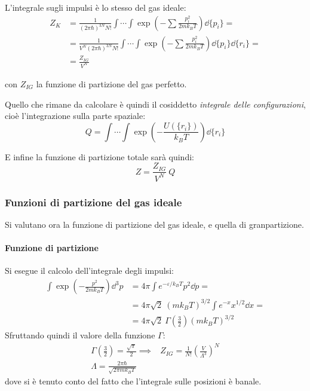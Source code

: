 L'integrale sugli impulsi è lo stesso del gas ideale:
\begin{align*}
Z_{K} &= \frac{1}{(2\pi \hbar)^{3N} N!}\int \cdots \int \exp \left(- \sum \frac{p_i^2}{2 m k_B T}\right) \dd\{p_i\} =\\ 
&= \frac{1}{V^N (2\pi \hbar)^{3N} N!}\int \cdots \int \exp \left(- \sum \frac{p_i^2}{2 m k_B T}\right) \dd\{p_i\} \dd\{r_i\} =\\
&= \frac{Z_{IG}}{V^N}
\end{align*}

\noindent con $Z_{IG}$ la funzione di partizione del gas perfetto.

Quello che rimane da calcolare è quindi il cosiddetto \textit{integrale delle configurazioni}, cioè l'integrazione sulla parte spaziale:
\begin{equation*}
	Q = \int \cdots \int \exp \left( - \frac{U(\{r_i\})}{k_B T}\right) \dd \{ r_i\}
\end{equation*}

E infine la funzione di partizione totale sarà quindi:
\begin{equation*}
	Z = \frac{Z_{IG}}{V^N}~Q
\end{equation*}

\subsubsection{Funzioni di partizione del gas ideale}
Si valutano ora la funzione di partizione del gas ideale, e quella di granpartizione.

\paragraph{Funzione di partizione} Si esegue il calcolo dell'integrale degli impulsi:
\begin{align*}
\int \exp \left(- \frac{p^2}{2 m k_B T}\right) \dd^3 p &= 4 \pi \int e^{- \varepsilon/ k_BT} p^2 \dd p =\\
&= 4 \pi \sqrt{2}~(mk_B T)^{3/2} \int e^{-x} x^{1/2} \dd x =\\
&= 4 \pi \sqrt{2}~\Gamma\left(\frac{3}{2}\right)(mk_B T)^{3/2}
\end{align*}
\noindent Sfruttando quindi il valore della funzione $\Gamma$:
\begin{align*}
\Gamma\left(\frac{3}{2}\right) = \frac{\sqrt{\pi}}{2} \implies& Z_{IG} = \frac{1}{N!}\left(\frac{V}{\Lambda^3}\right)^N\\
\Lambda = \frac{2\pi \hbar}{\sqrt{2 \pi m k_B T}}
\end{align*}
\noindent dove si è tenuto conto del fatto che l'integrale sulle posizioni è banale.

